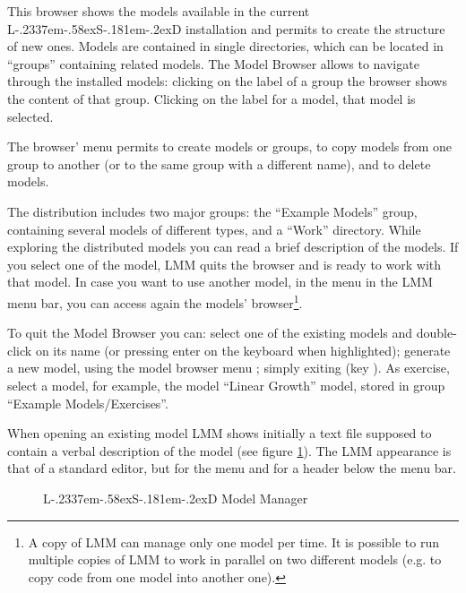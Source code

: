 \documentclass [11pt,a4paper] {book}
\def\LsD{{L\kern-.2337em\lower-.58ex\hbox{S}\kern-.181em\lower-.2ex\hbox{D}}\xspace}
\begin{document}
This browser shows the models available in the current \LsD installation and permits to create the structure of new ones.
Models are contained in single directories, which can be located in ``groups'' containing
related models. The Model Browser allows to navigate through the installed models:
clicking on the label of a group the browser shows the content of that group. Clicking on
the label for a model, that model is selected.

The browser' menu  permits to create models or groups, to copy models from one group
to another (or to the same group with a different name), and to delete models.

The distribution includes two major groups: the ``Example Models'' group, containing
several models of different types, and a ``Work'' directory. While exploring the distributed
models you can read a brief description of the models. If you select one of the model,
LMM quits the browser and is ready to work with that model. In case you want to use
another model, in the menu  in the LMM menu bar, you can
access again the models' browser\footnote{A copy of LMM can manage only one model per time. It is possible to run multiple copies of LMM to work in parallel on two different models (e.g. to copy code from one model into another one).}. 

To quit the Model Browser you can: select one of the existing models and double-click on its name (or pressing enter on the keyboard when highlighted); generate a new model, using the model browser menu ; simply exiting (key ). As exercise, select a model, for example, the model ``Linear Growth'' model, stored in group ``Example Models/Exercises''.

When opening an existing model LMM shows initially a text file supposed to contain a verbal description of the model (see figure \ref{fig:LMM}). The LMM appearance is that of a standard editor, but for the menu  and for a
header below the menu bar.

\begin{figure}[ht]
  \centering
  \caption{\LsD Model Manager}
  \label{fig:LMM}
\end{figure}
\end{document}
